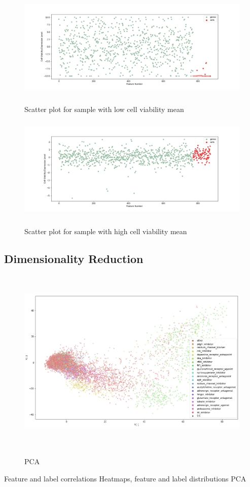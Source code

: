 \documentclass[bsc,frontabs,twoside,singlespacing,parskip,deptreport]{infthesis}     %
\let\Oldsubsection\subsection
\renewcommand{\subsection}{\FloatBarrier\Oldsubsection}
\begin{document}
\begin{figure}[h!]
\centering
\caption{Scatter plot for sample with low cell viability mean}
\includegraphics[height=5cm]{images/low_cell_mean.png}\label{low_mean}
\end{figure}
\begin{figure}[h!]
\centering
\caption{Scatter plot for sample with high cell viability mean}
\includegraphics[height=5cm]{images/high_cell_mean.png}\label{high_mean}
\end{figure}

\subsection{Dimensionality Reduction}
\begin{figure}[h!]
\centering
\caption{PCA}
\includegraphics[height=9cm]{images/pca_labelled.png}\label{pca map}
\end{figure}
Feature and label correlations
Heatmaps, feature and label distributions
PCA
\clearpage
\end{document}
